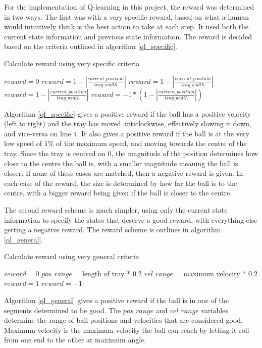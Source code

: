 \documentclass[12pt,a4paper]{article}
\begin{document}
For the implementation of Q-learning in this project, the reward was determined in two ways. The first was with a very specific reward, based on what a human would intuitively think is the best action to take at each step. It used both the current state information and previous state information. The reward is decided based on the criteria outlined in algorithm \ref{ql_specific}.
\begin{algorithm}[H]
	\caption{Calculate reward using very specific criteria}
	\label{ql_specific}
	\begin{algorithmic}[1]
		\State $reward = 0$
			\State $reward = 1 - |\frac{current\_position}{tray\_width}|$
			\State $reward = 1 - |\frac{current\_position}{tray\_width}|$
			\State $reward = 1 - |\frac{current\_position}{tray\_width}|$
		\Else 
			\State $reward = -1 * (1 -|\frac{current\_position}{tray\_width}|)$
		\EndIf
	\end{algorithmic}
\end{algorithm}
Algorithm \ref{ql_specific} gives a positive reward if the ball has a positive velocity (left to right) and the tray has moved anticlockwise, effectively slowing it down, and vice-versa on line 4. It also gives a positive reward if the ball is at the very low speed of 1\% of the maximum speed, and moving towards the centre of the tray. Since the tray is centred on 0, the magnitude of the position determines how close to the centre the ball is, with a smaller magnitude meaning the ball is closer. If none of these cases are matched, then a negative reward is given. In each case of the reward, the size is determined by how far the ball is to the centre, with a bigger reward being given if the ball is closer to the centre.

The second reward scheme is much simpler, using only the current state information to specify the states that deserve a good reward, with everything else getting a negative reward. The reward scheme is outlines in algorithm \ref{ql_general}.

\begin{algorithm}[H]
	\caption{Calculate reward using very general criteria}
	\label{ql_general}
	\begin{algorithmic}[1]
		\State $reward = 0$
		\State$pos\_range$ = length of tray * 0.2
		\State$vel\_range$ = maximum velocity * 0.2
			\State $reward = 1$
		\Else 
			\State $reward = -1$
		\EndIf
	\end{algorithmic}
\end{algorithm}
Algorithm \ref{ql_general} gives a positive reward if the ball is in one of the segments determined to be good. The $pos\_range$ and $vel\_range$ variables determine the range of ball positions and velocities that are considered good. Maximum velocity is the maximum velocity the ball can reach by letting it roll from one end to the other at maximum angle.
\end{document}
